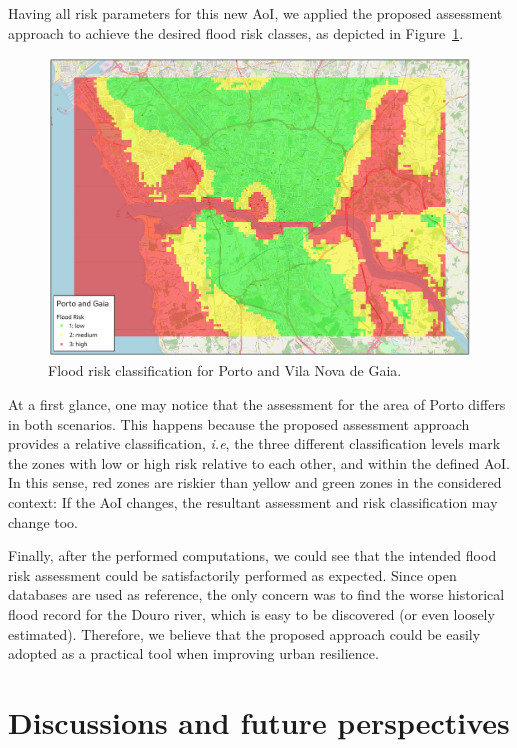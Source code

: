 \begin{refsection}
Having all risk parameters for this new AoI, we applied the proposed assessment approach to achieve the desired flood risk classes, as depicted in Figure~\ref{fig:porto_gaia}. 

\begin{figure}[h]
    \centering
    \includegraphics[width=0.9\linewidth]{Chapters/6-Flood/figs/porto_gaia.pdf}
    \caption{Flood risk classification for Porto and Vila Nova de Gaia.}
    \label{fig:porto_gaia}
\end{figure}

At a first glance, one may notice that the assessment for the area of Porto differs in both scenarios. This happens because the proposed assessment approach provides a relative classification, \textit{i.e}, the three different classification levels mark the zones with low or high risk relative to each other, and within the defined AoI. In this sense, red zones are riskier than yellow and green zones in the considered context: If the AoI changes, the resultant assessment and risk classification may change too.

Finally, after the performed computations, we could see that the intended flood risk assessment could be satisfactorily performed as expected. Since open databases are used as reference, the only concern was to find the worse historical flood record for the Douro river, which is easy to be discovered (or even loosely estimated). Therefore, we believe that the proposed approach could be easily adopted as a practical tool when improving urban resilience.

\section{Discussions and future perspectives}
\label{sec:applications}


\end{refsection}

